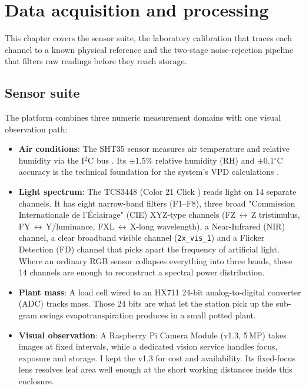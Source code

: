 ﻿\chapter{Data acquisition and processing}
\label{ch:data-acquisition}

This chapter covers the sensor suite, the laboratory calibration that traces each channel to a known physical reference and the two-stage noise-rejection pipeline that filters raw readings before they reach storage.

\section{Sensor suite}

The platform combines three numeric measurement domains with one visual observation path:
\begin{itemize}
    \item \textbf{Air conditions}: The SHT35 sensor measures air temperature and relative humidity via the I$^2$C bus \parencite{seeed-sht35}. Its $\pm$1.5\% relative humidity (RH) and $\pm$0.1$^\circ$C accuracy \parencite{sensirion-sht35} is the technical foundation for the system's VPD calculations \parencite{massmann2019vpd}. 
    \item \textbf{Light spectrum}: The TCS3448 (Color 21 Click \parencite{mikroe-color-21}) reads light on 14 separate channels. It has eight narrow-band filters (F1--F8), three broad "Commission Internationale de l'Éclairage" (CIE) XYZ-type channels (FZ$\,\leftrightarrow\,$Z tristimulus, FY$\,\leftrightarrow\,$Y/luminance, FXL$\,\leftrightarrow\,$X-long wavelength), a Near-Infrared (NIR) channel, a clear broadband visible channel (\texttt{2x\_vis\_1}) and a Flicker Detection (FD) channel that picks apart the frequency of artificial light. Where an ordinary RGB sensor collapses everything into three bands, these 14 channels are enough to reconstruct a spectral power distribution.
    \item \textbf{Plant mass}: A load cell wired to an HX711 24-bit analog-to-digital converter (ADC) \parencite{sparkfun-hx711} tracks mass. Those 24 bits are what let the station pick up the sub-gram swings evapotranspiration produces in a small potted plant.
    \item \textbf{Visual observation}: A Raspberry Pi Camera Module (v1.3, 5\,MP) takes images at fixed intervals, while a dedicated vision service handles focus, exposure and storage. I kept the v1.3 for cost and availability. Its fixed-focus lens resolves leaf area well enough at the short working distances inside this enclosure.
\end{itemize}

